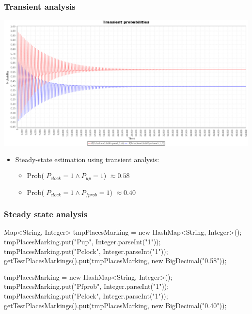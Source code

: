 \begin{frame}
  \frametitle{Transient analysis}
  \begin{center}
    \includegraphics[width=\textwidth]{img/rejuvenationTrans.png}    
  \end{center}
  \pause
  \begin{itemize}
  	\item Steady-state estimation using \alert{transient} analysis:
  	\begin{itemize}
  		\item Prob({\color{red} $P_{clock}=1 \land P_{up}=1$}) $\approx 0.58$
  		\item Prob({\color{blue} $P_{clock}=1 \land P_{fprob}=1$}) $\approx 0.40$
  	\end{itemize}
  \end{itemize}
\end{frame}

\begin{frame}[fragile]
  \frametitle{Steady state analysis}
  \footnotesize
  \begin{jblock}
Map<String, Integer> tmpPlacesMarking = new HashMap<String, Integer>();
tmpPlacesMarking.put("Pup", Integer.parseInt("1"));
tmpPlacesMarking.put("Pclock", Integer.parseInt("1"));
getTestPlacesMarkings().put(tmpPlacesMarking, new BigDecimal("0.58"));

tmpPlacesMarking = new HashMap<String, Integer>();
tmpPlacesMarking.put("Pfprob", Integer.parseInt("1"));
tmpPlacesMarking.put("Pclock", Integer.parseInt("1"));
getTestPlacesMarkings().put(tmpPlacesMarking, new BigDecimal("0.40"));
  \end{jblock}
  \pause
  \begin{center}
  \end{center}
\end{frame}

